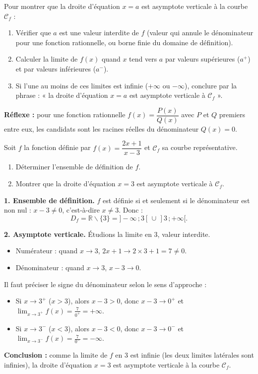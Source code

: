 \documentclass[11pt]{article}
\newcommand{\cle}[1]{{\popxbold\color{popdark}#1}}
\def\setminus{\mathbin{\backslash}}\let\smallsetminus\setminus
\begin{document}
\begin{methode}[Montrer qu'une droite $x = a$ est asymptote verticale]
Pour montrer que la droite d'équation $x = a$ est \cle{asymptote verticale} à la courbe $\mathcal{C}_f$ :
\begin{enumerate}
\item Vérifier que $a$ est une \cle{valeur interdite} de $f$ (valeur qui annule le dénominateur pour une fonction rationnelle, ou borne finie du domaine de définition).
\item Calculer la limite de $f(x)$ quand $x$ tend vers $a$ par valeurs supérieures ($a^+$) et par valeurs inférieures ($a^-$).
\item Si l'une au moins de ces limites est infinie ($+\infty$ ou $-\infty$), conclure par la phrase : « la droite d'équation $x = a$ est asymptote verticale à $\mathcal{C}_f$ ».
\end{enumerate}
\textbf{Réflexe :} pour une fonction rationnelle $f(x)=\dfrac{P(x)}{Q(x)}$ avec $P$ et $Q$ premiers entre eux, les candidats sont les racines réelles du dénominateur $Q(x)=0$.
\end{methode}

\begin{exoresolu}
Soit $f$ la fonction définie par $f(x)=\dfrac{2x+1}{x-3}$ et $\mathcal{C}_f$ sa courbe représentative.
\begin{enumerate}
\item Déterminer l'ensemble de définition de $f$.
\item Montrer que la droite d'équation $x=3$ est asymptote verticale à $\mathcal{C}_f$.
\end{enumerate}
\tcblower
\textbf{1. Ensemble de définition.} $f$ est définie si et seulement si le dénominateur est non nul : $x-3\neq 0$, c'est-à-dire $x\neq 3$. Donc :
\[ D_f=\mathbb{R}\setminus\{3\}=]-\infty\,;3[\,\cup\,]3\,;+\infty[. \]

\textbf{2. Asymptote verticale.} Étudions la limite en $3$, valeur interdite.
\begin{itemize}
\item Numérateur : quand $x\to 3$, $2x+1\to 2\times 3+1=7 \neq 0$.
\item Dénominateur : quand $x\to 3$, $x-3\to 0$.
\end{itemize}
Il faut préciser le signe du dénominateur selon le sens d'approche :
\begin{itemize}
\item Si $x\to 3^+$ ($x>3$), alors $x-3>0$, donc $x-3\to 0^+$ et $\displaystyle\lim_{x\to 3^+}f(x)=\frac{7}{0^+}=+\infty$.
\item Si $x\to 3^-$ ($x<3$), alors $x-3<0$, donc $x-3\to 0^-$ et $\displaystyle\lim_{x\to 3^-}f(x)=\frac{7}{0^-}=-\infty$.
\end{itemize}
\textbf{Conclusion :} comme la limite de $f$ en $3$ est infinie (les deux limites latérales sont infinies), la droite d'équation $x=3$ est asymptote verticale à la courbe $\mathcal{C}_f$.
\end{exoresolu}
\end{document}
